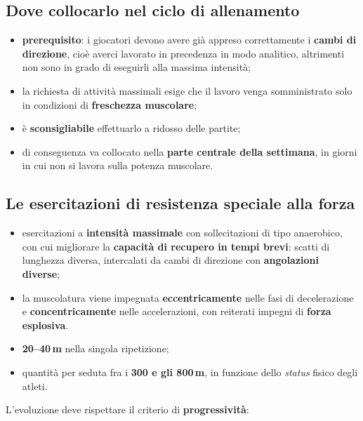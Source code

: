\subsection{Dove collocarlo nel ciclo di allenamento}

\begin{itemize}
  \item \textbf{prerequisito}: i giocatori devono avere già appreso correttamente i \textbf{cambi di
    direzione}, cioè averci lavorato in precedenza in modo analitico, altrimenti non sono in grado di
    eseguirli alla massima intensità;
  \item la richiesta di attività massimali esige che il lavoro venga somministrato solo in
    condizioni di \textbf{freschezza muscolare};
  \item è \textbf{sconsigliabile} effettuarlo a ridosso delle partite;
  \item di conseguenza va collocato nella \textbf{parte centrale della settimana}, in giorni in cui
    non si lavora sulla potenza muscolare.
\end{itemize}

\subsection{Le esercitazioni di resistenza speciale alla forza}

\begin{itemize}
  \item esercitazioni a \textbf{intensità massimale} con sollecitazioni di tipo anaerobico, con cui
    migliorare la \textbf{capacità di recupero in tempi brevi}: scatti di lunghezza diversa,
    intercalati da cambi di direzione con \textbf{angolazioni diverse};
  \item la muscolatura viene impegnata \textbf{eccentricamente} nelle fasi di decelerazione e
    \textbf{concentricamente} nelle accelerazioni, con reiterati impegni di \textbf{forza
    esplosiva}.
\end{itemize}

\begin{itemize}
  \item \textbf{20--40\,m} nella singola ripetizione;
  \item quantità per seduta fra i \textbf{300 e gli 800\,m}, in funzione dello \textit{status} fisico
    degli atleti.
\end{itemize}

L'evoluzione deve rispettare il criterio di \textbf{progressività}:

